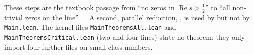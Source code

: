 These steps are the textbook passage from ``no zeros in $\operatorname{Re}s>\frac12$'' to ``all
non-trivial zeros on the line'' \stcs~\cite[Ch.~8--9]{davenport}. A second, parallel reduction,
,
is used by  but not by \texttt{Main.lean}.
The kernel files \texttt{MainTheoremsAll.lean} and \texttt{MainTheoremsCritical.lean} (two and four
lines) state no theorem; they only import four further files on small class numbers.
